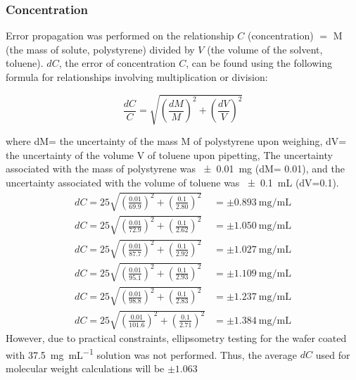 \documentclass[twocolumn]{article}
\begin{document}
                \subsubsection{Concentration}
                    Error propagation was performed on the relationship $C$ (concentration) $=$ M (the mass of solute, polystyrene) divided by $V$ (the volume of the solvent, toluene). $dC$, the error of concentration $C$, can be found using the following formula for relationships involving multiplication or division: 
                    
                    \begin{equation}
                        \frac{dC}{C} = \sqrt{(\frac{dM}{M})^2 + (\frac{dV}{V})^2}
                    \end{equation}
                    
                    where dM= the uncertainty of the mass M of polystyrene upon weighing, dV= the uncertainty of the volume V of toluene upon pipetting, The uncertainty associated with the mass of polystyrene was \qty{\pm 0.01}{\milli\gram} (dM= 0.01), and the uncertainty associated with the volume of toluene was \qty{\pm 0.1}{\milli\liter} (dV=0.1). 
                    \begin{align}
                        dC = 25\sqrt{(\frac{0.01}{69.9})^2 + (\frac{0.1}{2.80})^2} &= \pm \qty{0.893}{\milli\gram\per\milli\liter}\\
                        dC = 25\sqrt{(\frac{0.01}{72.9})^2 + (\frac{0.1}{2.62})^2} &= \pm \qty{1.050}{\milli\gram\per\milli\liter}\\
                        dC = 25\sqrt{(\frac{0.01}{87.7})^2 + (\frac{0.1}{2.92})^2} &= \pm \qty{1.027}{\milli\gram\per\milli\liter}\\
                        dC = 25\sqrt{(\frac{0.01}{95.1})^2 + (\frac{0.1}{2.93})^2} &= \pm \qty{1.109}{\milli\gram\per\milli\liter}\\
                        dC = 25\sqrt{(\frac{0.01}{98.8})^2 + (\frac{0.1}{2.83})^2} &= \pm \qty{1.237}{\milli\gram\per\milli\liter}\\
                        dC = 25\sqrt{(\frac{0.01}{101.6})^2 + (\frac{0.1}{2.71})^2} &= \pm \qty{1.384}{\milli\gram\per\milli\liter}
                    \end{align}
                    However, due to practical constraints, ellipsometry testing for the wafer coated with \qty{37.5}{\milli\gram\per\milli\liter} solution was not performed. Thus, the average $dC$ used for molecular weight calculations will be $\pm 1.063$
\end{document}

